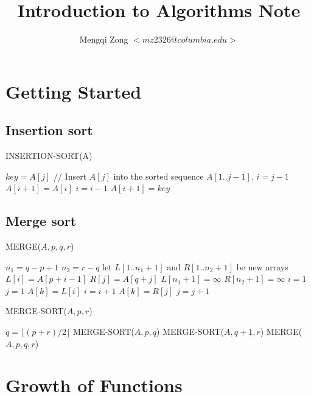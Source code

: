 \documentclass[12pt]{article}
\title{Introduction to Algorithms Note}
\author{Mengqi Zong $<mz2326@columbia.edu>$}
\begin{document}
\maketitle

\setlength{\parindent}{0in}

\section{Getting Started}

\subsection{Insertion sort}

INSERTION-SORT(A)
\begin{algorithmic}[1]
	\State $key = A[j]$
        \State // Insert $A[j]$ into the sorted sequence $A[1..j-1]$.
        \State $i = j - 1$
        	\State $A[i+1] = A[i]$
                \State $i = i - 1$
        \EndWhile
        \State $A[i+1] = key$
\EndFor
\end{algorithmic}

\subsection{Merge sort}

MERGE($A, p, q, r$)
\begin{algorithmic}[1]
\State $n_1 = q - p + 1$
\State $n_2 = r - q$
\State let $L[1..n_1+1]$ and $R[1..n_2+1]$ be new arrays
	\State $L[i] = A[p+i-1]$
\EndFor
{}
	\State $R[j] = A[q+j]$
\EndFor
\State $L[n_1 + 1] = \infty$
\State $R[n_2 + 1] = \infty$
\State $i = 1$
\State $j = 1$
        	\State $A[k] = L[i]$
                \State $i = i + 1$
        \Else
        	\State $A[k] = R[j]$
        	\State $j = j + 1$
        \EndIf
\EndFor
\end{algorithmic}

MERGE-SORT($A, p, r$)
\begin{algorithmic}[1]
	\State $q = \lfloor (p+r)/2 \rfloor$
        \State MERGE-SORT($A, p, q$)
        \State MERGE-SORT($A, q+1, r$)
        \State MERGE($A, p, q, r$)
\EndIf
\end{algorithmic}

\section{Growth of Functions}
\end{document}
